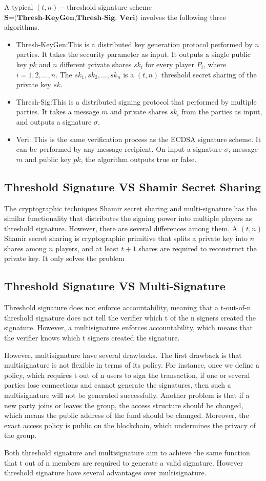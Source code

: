 \documentclass[12pt]{report}
\begin{document}
A typical $(t,n)-$threshold signature scheme $\textbf{S=(Thresh-KeyGen,Thresh-Sig, Veri)}$ involves the following three algorithms.
\begin{itemize}
	\item{Thresh-KeyGen:}This is a distributed key generation protocol performed by $n$ parties. It takes the security parameter as input. It outputs a single public key $pk$ and $n$ different private shares $sk_i$ for every player $P_i$, where $i=1,2,...,n$. The $sk_1, sk_2,..., sk_n$ is a $(t,n)$ threshold secret sharing of the private key $sk$.
	\item{Thresh-Sig:}This is a distributed signing protocol that performed by multiple parties. It takes a message $m$ and private shares $sk_i$ from the parties as input, and outputs a signature $\sigma$.
	\item{Veri:} This is the same verification process as the ECDSA signature scheme. It can be performed by any message recipient. On input a signature $\sigma$, message $m$ and public key $pk$, the algorithm outputs true or false.
\end{itemize}



\subsection{Threshold Signature VS Shamir Secret Sharing}
The cryptographic techniques Shamir secret sharing and multi-signature has the similar functionality that distributes the signing power into multiple players as threshold signature. However, there are several differences among them.
A $(t,n)$ Shamir secret sharing is cryptographic primitive that splits a private key into $n$ shares among $n$ players, and at least $t+1$ shares are required to reconstruct the private key. It only solves the problem 



\subsection{Threshold Signature VS Multi-Signature}


Threshold signature does not enforce accountability, meaning that a t-out-of-n threshold signature does not tell the verifier which t of the n signers created the signature. However, a multisignature enforces accountability, which means that the verifier knows which t signers created the signature.

However, multisignature have several drawbacks. The first drawback is that multisignature is not flexible in terms of its policy. For instance, once we define a policy, which requires t out of n users to sign the transaction, if one or several parties lose connections and cannot generate the signatures, then such a multisignature will not be generated successfully. Another problem is that if a new party joins or leaves the group, the access structure should be changed, which means the public address of the fund should be changed. Moreover, the exact access policy is public on the blockchain, which undermines the privacy of the group.

Both threshold signature and multisignature aim to achieve the same function that t out of n members are required to generate a valid signature. However threshold signature have several advantages over multisignature. 
\end{document}
